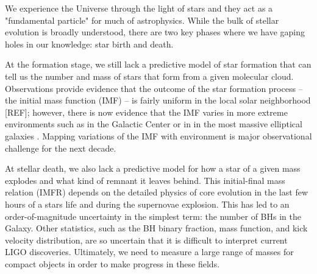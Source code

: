 \documentclass[11pt]{article}
\begin{document}
%


%

\sciencejustification

We experience the Universe through the light of stars and they 
act as a "fundamental particle" for much of astrophysics. 
While the bulk of stellar evolution is broadly understood, there are two key phases where we have gaping holes in our knowledge: star birth and death. 

At the formation stage, we still lack a predictive model of star formation that can tell us the number and mass of stars that form from a given molecular cloud. 
Observations provide evidence that the outcome of the star formation process -- the initial mass function (IMF) -- is fairly uniform in the local solar neighborhood [REF]; however, there is now evidence that the IMF varies in more extreme environments such as in the Galactic Center \citep{Lu:2013,Hosek:2018b} or in in the most massive elliptical galaxies \citep{vanDokkum:2010}. 
Mapping variations of the IMF with environment is major observational challenge for the next decade. 

At stellar death, we also lack a predictive model for how a star of a
given mass explodes and what kind of remnant it leaves behind. 
This initial-final mass relation (IMFR) depends on the detailed physics of
core evolution in the last few hours of a stars life and during the
supernovae explosion. 
This has led to an order-of-magnitude uncertainty in the simplest
term: the number of BHs in the Galaxy. Other statistics, such as the
BH binary fraction, mass function, and kick velocity distribution, are
so uncertain that it is difficult to interpret current LIGO
discoveries. Ultimately, we need to measure a large range of masses
for compact objects in order to make progress in these fields. 
\end{document}
